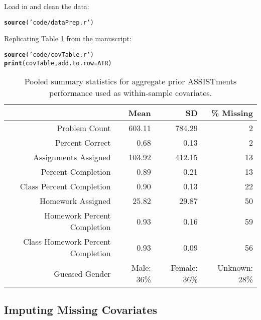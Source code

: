 \documentclass[12pt]{article}\usepackage[]{graphicx}\usepackage[]{xcolor}
\makeatletter
\newcommand{\hlstr}[1]{\textcolor[rgb]{0.192,0.494,0.8}{#1}}%
\newcommand{\hlstd}[1]{\textcolor[rgb]{0.345,0.345,0.345}{#1}}%
\newcommand{\hlkwc}[1]{\textcolor[rgb]{0.333,0.667,0.333}{#1}}%
\newcommand{\hlkwd}[1]{\textcolor[rgb]{0.737,0.353,0.396}{\textbf{#1}}}%
\newenvironment{kframe}{%
 \def\at@end@of@kframe{}%
 \ifinner\ifhmode%
  \def\at@end@of@kframe{\end{minipage}}%
  \begin{minipage}{\columnwidth}%
 \fi\fi%
 \def\FrameCommand##1{\hskip\@totalleftmargin \hskip-\fboxsep
 \colorbox{shadecolor}{##1}\hskip-\fboxsep
     \hskip-\linewidth \hskip-\@totalleftmargin \hskip\columnwidth}%
 \MakeFramed {\advance\hsize-\width
   \@totalleftmargin\z@ \linewidth\hsize
   \@setminipage}}%
 {\par\unskip\endMakeFramed%
 \at@end@of@kframe}
\newenvironment{knitrout}{}{} %
\makeatother
\begin{document}
Load in and clean the data:\\

\begin{knitrout}
\color{fgcolor}\begin{kframe}
\begin{alltt}
\hlkwd{source}\hlstd{(}\hlstr{'code/dataPrep.r'}\hlstd{)}
\end{alltt}
\end{kframe}
\end{knitrout}

Replicating Table \ref{tab:covariates} from the manuscript:

\begin{kframe}
\begin{alltt}
\hlkwd{source}\hlstd{(}\hlstr{'code/covTable.r'}\hlstd{)}
\hlkwd{print}\hlstd{(covTable,} \hlkwc{add.to.row}\hlstd{=ATR)}
\end{alltt}
\end{kframe}%
\begin{table}[ht]
\centering
\begin{tabular}{rrrr}
  \hline
 & Mean & SD & \% Missing \\ 
  \hline
Problem Count & 603.11 & 784.29 & 2 \\ 
  Percent Correct & 0.68 & 0.13 & 2 \\ 
  Assignments Assigned & 103.92 & 412.15 & 13 \\ 
  Percent Completion & 0.89 & 0.21 & 13 \\ 
  Class Percent Completion & 0.90 & 0.13 & 22 \\ 
  Homework Assigned & 25.82 & 29.87 & 50 \\ 
  Homework Percent Completion & 0.93 & 0.16 & 59 \\ 
  Class Homework Percent Completion & 0.93 & 0.09 & 56 \\ 
   Guessed Gender&Male: 36\%&Female: 36\%&Unknown: 28\%\\
 \hline
\end{tabular}
\caption{Pooled summary statistics for aggregate prior ASSISTments performance used as within-sample covariates.} 
\label{tab:covariates}
\end{table}


\subsection{Imputing Missing Covariates}
\end{document}
